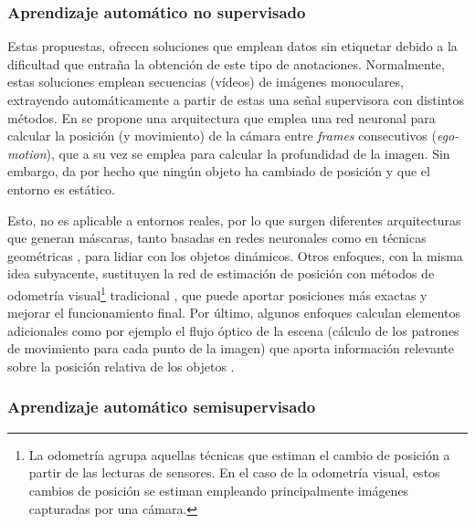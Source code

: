

\subsubsection{Aprendizaje automático no supervisado}

Estas propuestas, ofrecen soluciones que emplean datos sin etiquetar debido a la dificultad que entraña la obtención de este tipo de anotaciones. Normalmente, estas soluciones emplean secuencias (vídeos) de imágenes monoculares, extrayendo automáticamente a partir de estas una señal supervisora con distintos métodos. En \cite{zhou2017unsupervised} se propone una arquitectura que emplea una red neuronal para calcular la posición (y movimiento) de la cámara entre \textit{frames} consecutivos (\textit{ego-motion}), que a su vez se emplea para calcular la profundidad de la imagen. Sin embargo, da por hecho que ningún objeto ha cambiado de posición y que el entorno es estático. 

Esto, no es aplicable a entornos reales, por lo que surgen diferentes arquitecturas que generan máscaras, tanto basadas en redes neuronales \cite{zhou2017unsupervised, vijayanarasimhan2017sfmnet} como en técnicas geométricas \cite{geo_mask_egomotion, monodepth}, para lidiar con los objetos dinámicos. Otros enfoques, con la misma idea subyacente, sustituyen la red de estimación de posición con métodos de odometría visual\footnote{La odometría agrupa aquellas técnicas que estiman el cambio de posición a partir de las lecturas de sensores. En el caso de la odometría visual, estos cambios de posición se estiman empleando principalmente imágenes capturadas por una cámara.} tradicional \cite{visualodometryunsupervised}, que puede aportar posiciones más exactas y mejorar el funcionamiento final. Por último, algunos enfoques calculan elementos adicionales como por ejemplo el flujo óptico de la escena (cálculo de los patrones de movimiento para cada punto de la imagen) que aporta información relevante sobre la posición relativa de los objetos \cite{vijayanarasimhan2017sfmnet, geonet}. 

\subsubsection{Aprendizaje automático semisupervisado}

